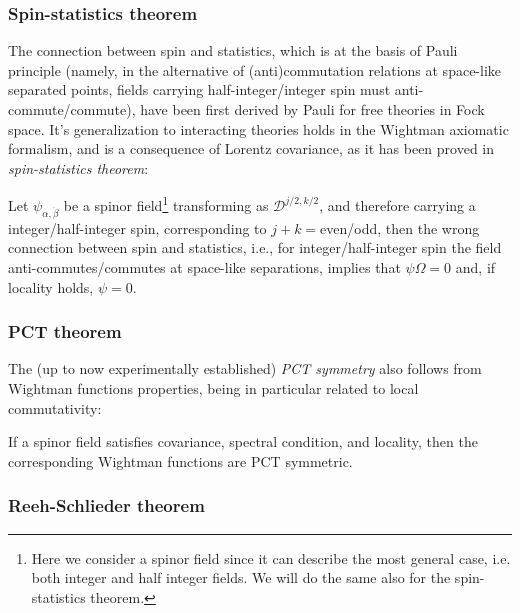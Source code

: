 \documentclass[../main/main.tex]{subfiles}
\begin{document}
\subsubsection{Spin-statistics theorem}

The connection between spin and statistics, which is at the basis of Pauli principle (namely, in the alternative of (anti)commutation relations at space-like separated points, fields carrying half-integer/integer spin must anti-commute/commute), have been first derived by Pauli for free theories in Fock space. It's generalization to interacting theories holds in the Wightman axiomatic formalism, and is a consequence of Lorentz covariance, as it has been proved in \emph{spin-statistics theorem}:
\begin{theorem}
	Let $\psi_{\alpha,\dot\beta}$ be a spinor field\footnote{Here we consider a spinor field since it can describe the most general case, i.e. both integer and half integer fields. We will do the same also for the spin-statistics theorem.} transforming as $\mathcal D^{j/2,k/2}$, and therefore carrying a integer/half-integer spin, corresponding to $j+k=$even/odd, then the wrong connection between spin and statistics, i.e., for integer/half-integer spin the field anti-commutes/commutes at space-like separations, implies that $\psi\Omega=0$ and, if locality holds, $\psi=0$.
\end{theorem}

\subsubsection{PCT theorem}

The (up to now experimentally established) \emph{PCT symmetry} also follows from Wightman functions properties, being in particular related to local commutativity:
\begin{theorem}
	If a spinor field satisfies covariance, spectral condition, and locality, then the corresponding Wightman functions are PCT symmetric.
\end{theorem}

\subsubsection{Reeh-Schlieder theorem}
\end{document}

